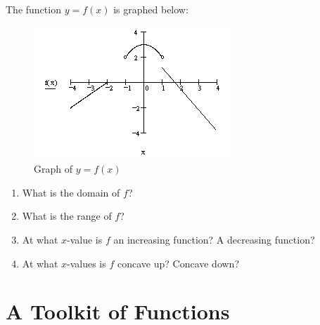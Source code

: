 \documentclass[10pt,]{book}
\theoremstyle{ptxdefinitionnotitle}
\theoremstyle{ptxdefinitiontitle}
\numberwithin{equation}{section}
\begin{document}
\begin{divisionexercise}{10}\hypertarget{chapter02-section01-exercise10}{}
\hypertarget{p-39}{}%
The function \(y = f(x)\) is graphed below: \begin{figure}
\centering
\includegraphics[width=1\linewidth]{./src/images/chapter02/chapter02section01-exercise10-graph.png}
\caption{Graph of \(y = f(x)\)\label{chapter02-section01-exercise10-graph}}
\end{figure}
 \leavevmode%
\begin{enumerate}[label=(\alph*)]
\item\hypertarget{li-50}{}What is the domain of \(f\)?%
\item\hypertarget{li-51}{}What is the range of \(f\)?%
\item\hypertarget{li-52}{}At what \(x\)-value is \(f\) an increasing function? A decreasing function?%
\item\hypertarget{li-53}{}At what \(x\)-values is \(f\) concave up? Concave down?%
\end{enumerate}
%
\end{divisionexercise}%
\typeout{************************************************}
\typeout{************************************************}
\section[{A Toolkit of Functions}]{A Toolkit of Functions}\label{chapter02-section02}
\typeout{************************************************}
\typeout{************************************************}
\end{document}
